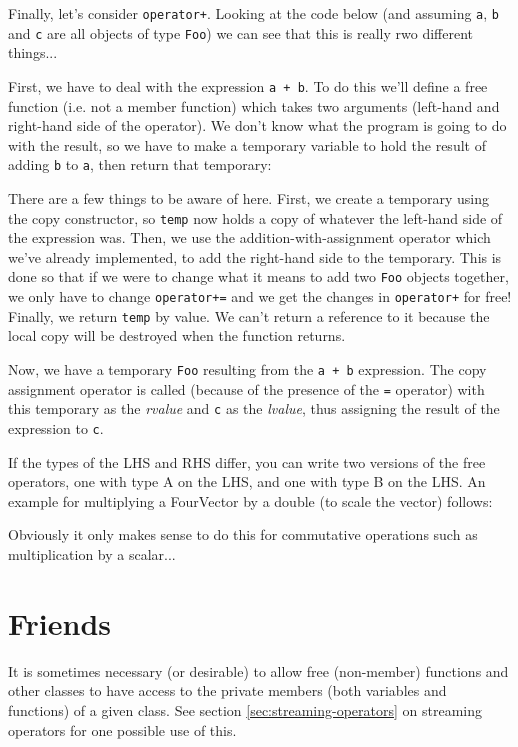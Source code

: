\documentclass[a4paper]{scrartcl}
\begin{document}
Finally, let's consider \verb|operator+|. Looking at the code below (and assuming \verb|a|, \verb|b| and \verb|c| are all objects of type \verb|Foo|) we can see that this is really rwo different things...



First, we have to deal with the expression \verb|a + b|. To do this we'll define a free function (i.e. not a member function) which takes two arguments (left-hand and right-hand side of the operator). We don't know what the program is going to do with the result, so we have to make a temporary variable to hold the result of adding \verb|b| to \verb|a|, then return that temporary:



There are a few things to be aware of here. First, we create a temporary using the copy constructor, so \verb|temp| now holds a copy of whatever the left-hand side of the expression was. Then, we use the addition-with-assignment operator which we've already implemented, to add the right-hand side to the temporary. This is done so that if we were to change what it means to add two \verb|Foo| objects together, we only have to change \verb|operator+=| and we get the changes in \verb|operator+| for free! Finally, we return \verb|temp| by value. We can't return a reference to it because the local copy will be destroyed when the function returns.

Now, we have a temporary \verb|Foo| resulting from the \verb|a + b| expression. The copy assignment operator is called (because of the presence of the \verb|=| operator) with this temporary as the \emph{rvalue} and \verb|c| as the \emph{lvalue}, thus assigning the result of the expression to \verb|c|.

If the types of the LHS and RHS differ, you can write two versions of the free operators, one with type A on the LHS, and one with type B on the LHS. An example for multiplying a FourVector by a double (to scale the vector) follows:



Obviously it only makes sense to do this for commutative operations such as multiplication by a scalar...

\section{Friends}\label{sec:friend}
It is sometimes necessary (or desirable) to allow free (non-member) functions and other classes to have access to the private members (both variables and functions) of a given class. See section \ref{sec:streaming-operators} on streaming operators for one possible use of this.
\end{document}
